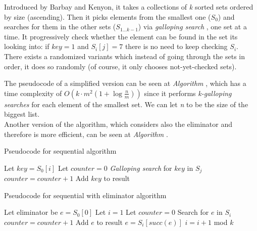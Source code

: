 Introduced by Barbay and Kenyon, it takes a collections of \textit{k} sorted sets ordered by size (ascending). Then it picks elements from the smallest one ($S_0$) and searches for them in the other sets ($S_{1 \ldots k-1}$) via \textit{galloping search} , one set at a time. It progressively check whether the element can be found in the set its looking into: if $key=1$ and $S_i[j]=7$ there is no need to keep checking $S_i$.
There exists a randomized variants which instead of going through the sets in order, it does so randomly (of course, it only chooses not-yet-checked sets).

The pseudocode of a simplified version can be seen at \textit{Algorithm} , which has a time complexity of $O\left(k \cdot m^2 \left(1+ \log \frac{n}{m}\right)\right)$ since it performs \textit{k-galloping searches} for each element of the smallest set. We can let \textit{n} to be the size of the biggest list.\\
Another version of the algorithm, which considers also the eliminator and therefore is more efficient, can be seen at \textit{Algorithm} .

\begin{algorithm}
    \captionsetup{labelsep=newline}
    \caption{Pseudocode for sequential algorithm \label{alg:sequential}}
    \begin{algorithmic}[1]
            \State Let $key=S_0[i]$
            \State Let $counter=0$
                \State \textit{Galloping search} for $key$ in $S_j$
                    \State $counter = counter+1$
                \EndIf
            \EndFor
                \State Add $key$ to result
            \EndIf
        \EndFor
    \end{algorithmic}
\end{algorithm}

\begin{algorithm}
    \captionsetup{labelsep=newline}
    \caption{Pseudocode for sequential with eliminator algorithm \label{alg:sequential2}}
    \begin{algorithmic}[1]
        \State Let eliminator be $e=S_0[0]$ 
        \State Let $i=1$
        \State Let $counter=0$
            \State Search for $e$ in $S_i$
                \State $counter=counter+1$
                    \State Add $e$ to result
                \EndIf
            \Else
                \State $e=S_i\left[succ(e)\right]$
            \EndIf
            \State $i=i+1$ mod $k$
        \EndWhile
    \end{algorithmic}
\end{algorithm}